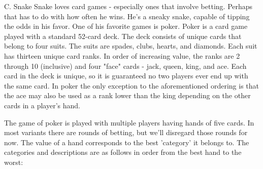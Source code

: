 \begin{problem}{C. Snake}
Snake loves card games - especially ones that involve betting. Perhaps that has to do with how often he wins. He's a sneaky snake, capable of tipping the odds in his favor. One of his favorite games is poker. Poker is a card game played with a standard 52-card deck. The deck consists of unique cards that belong to four suits. The suits are spades, clubs, hearts, and diamonds. Each suit has thirteen unique card ranks. In order of increasing value, the ranks are 2 through 10 (inclusive) and four "face" cards - jack, queen, king, and ace. Each card in the deck is unique, so it is guaranteed no two players ever end up with the same card. In poker the only exception to the aforementioned ordering is that the ace may also be used as a rank lower than the king depending on the other cards in a player's hand.

The game of poker is played with multiple players having hands of five cards. In most variants there are rounds of betting, but we'll disregard those rounds for now. The value of a hand corresponds to the best 'category' it belongs to. The categories and descriptions are as follows in order from the best hand to the worst:


\end{problem}
